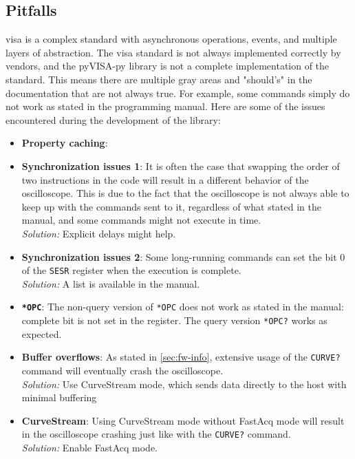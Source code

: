 \documentclass[a4paper,english,twoside,10pt]{article}
\begin{document}
\subsection{Pitfalls}\label{sec:pitfalls}
\gls{visa} is a complex standard with asynchronous operations, events, and multiple layers of abstraction. The \gls{visa} standard is not always implemented correctly by vendors, and the pyVISA-py library is not a complete implementation of the standard. This means there are multiple gray areas and "should's" in the documentation that are not always true. For example, some commands simply do not work as stated in the programming manual\cite{tektronix:mso-progman}. Here are some of the issues encountered during the development of the library:
\begin{itemize}
	\item \textbf{Property caching}: 
	\item \textbf{Synchronization issues 1}: It is often the case that swapping the order of two instructions in the code will result in a different behavior of the oscilloscope. This is due to the fact that the oscilloscope is not always able to keep up with the commands sent to it, regardless of what stated in the manual\cite[p.~1915]{tektronix:mso-progman}, and some commands might not execute in time.\\
	\textit{Solution:} Explicit delays might help.
	\item \textbf{Synchronization issues 2}: Some long-running commands can set the bit 0 of the \texttt{SESR} register when the execution is complete.\\
	\textit{Solution:} A list is available in the manual\cite[t.~3-3]{tektronix:mso-progman}.
	\item \textbf{\texttt{*OPC}}: The non-query version of \texttt{*OPC} does not work as stated in the manual\cite[p.~1001]{tektronix:mso-progman}: complete bit is not set in the register. The query version \texttt{*OPC?} works as expected.
	\item \textbf{Buffer overflows}: As stated in \autoref{sec:fw-info}, extensive usage of the \texttt{CURVE?} command will eventually crash the oscilloscope.\\
	\textit{Solution:} Use CurveStream mode, which sends data directly to the host with minimal buffering
	\item \textbf{CurveStream}: Using CurveStream mode without FastAcq mode will result in the oscilloscope crashing just like with the \texttt{CURVE?} command.\\
	\textit{Solution:} Enable FastAcq mode.

\end{itemize}
\end{document}
